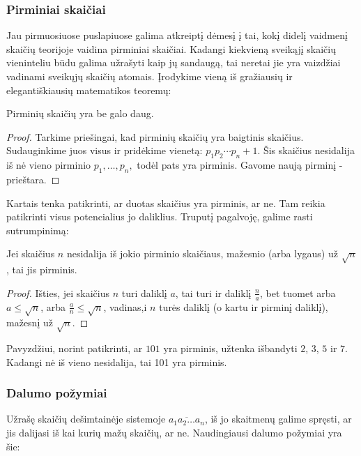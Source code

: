 \subsubsection{Pirminiai skaičiai}

Jau pirmuosiuose puslapiuose galima atkreiptį dėmesį į tai, kokį didelį vaidmenį
skaičių teorijoje vaidina pirminiai skaičiai. Kadangi kiekvieną sveikąjį
skaičių vieninteliu būdu galima užrašyti kaip jų sandaugą, tai neretai jie
yra vaizdžiai vadinami sveikųjų skaičių atomais. Įrodykime vieną iš
gražiausių ir elegantiškiausių matematikos teoremų:

\begin{thm} 
  Pirminių skaičių yra be galo daug.  
\end{thm} 

\begin{proof} 
  Tarkime priešingai, kad pirminių skaičių yra baigtinis skaičius.
  Sudauginkime juos visus ir pridėkime vienetą: $p_1p_2\cdots p_n + 1$. Šis
  skaičius nesidalija iš nė vieno pirminio $p_1, \dots, p_n,$ todėl pats
  yra pirminis. Gavome naują pirminį - prieštara.
\end{proof}

Kartais tenka patikrinti, ar duotas skaičius yra pirminis, ar ne. Tam reikia
patikrinti visus potencialius jo daliklius. Truputį pagalvoję, galime rasti
sutrumpinimą: 

\begin{teig} 
  Jei skaičius $n$ nesidalija iš jokio pirminio skaičiaus, mažesnio (arba
  lygaus) už $\sqrt{n}$, tai jis pirminis.
\end{teig} 

\begin{proof}
  Išties, jei skaičius $n$ turi daliklį $a$, tai turi ir daliklį
  $\frac{n}{a}$, bet tuomet arba $a\leq \sqrt{n}$, arba $\frac{a}{n} \leq
  \sqrt{n}$, vadinas,i $n$ turės daliklį (o kartu ir pirminį daliklį),
  mažesnį už $\sqrt{n}$. 
\end{proof}

Pavyzdžiui, norint patikrinti, ar $101$ yra pirminis, užtenka išbandyti $2$,
$3$, $5$ ir $7$. Kadangi nė iš vieno nesidalija, tai 101 yra pirminis.

\subsubsection{Dalumo požymiai}

Užrašę skaičių dešimtainėje sistemoje $\overline{a_1a_2\dots a_n}$, iš jo
skaitmenų galime spręsti, ar jis dalijasi iš kai kurių mažų skaičių, ar ne.
Naudingiausi dalumo požymiai yra šie:


